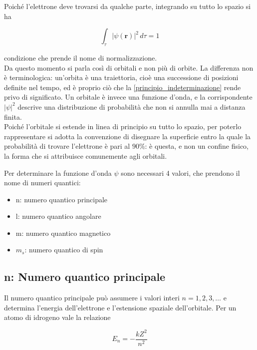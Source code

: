 Poiché l'elettrone deve trovarsi da qualche parte, integrando su tutto lo spazio si ha

\begin{equation}
    \int_{\tau} |\psi(\mathbf{r})|^2 \, d\tau = 1
    \label{eq:normalizzazione}
\end{equation}

condizione che prende il nome di normalizzazione.\\

Da questo momento si parla così di orbitali e non più di orbite. 
La differenza non è terminologica: un'orbita è una traiettoria, cioè una successione di posizioni definite nel tempo, ed è proprio ciò che la \eqref{principio_indeterminazione} rende privo di significato. 
Un orbitale è invece una funzione d'onda, e la corrispondente $|\psi|^2$ descrive una distribuzione di probabilità che non si annulla mai a distanza finita.\\

Poiché l'orbitale si estende in linea di principio su tutto lo spazio, per poterlo rappresentare si adotta la convenzione di disegnare la superficie entro la quale la probabilità di trovare l'elettrone è pari al $90\%$: è questa, e non un confine fisico, la forma che si attribuisce comunemente agli orbitali.

Per determinare la funzione d'onda $\psi$ sono necessari 4 valori, che prendono il nome di numeri quantici:

\begin{itemize}
    \item n: numero quantico principale
    \item l: numero quantico angolare 
    \item m: numero quantico magnetico 
    \item $m_s$: numero quantico di spin
\end{itemize}

\subsection{n: Numero quantico principale}

Il numero quantico principale può assumere i valori interi $n = 1, 2, 3, \dots$ e determina l'energia dell'elettrone e l'estensione spaziale dell'orbitale. 
Per un atomo di idrogeno vale la relazione

\begin{equation}
    E_n = - \frac{k Z^2}{n^2}
    \label{eq:energia_n}
\end{equation}

